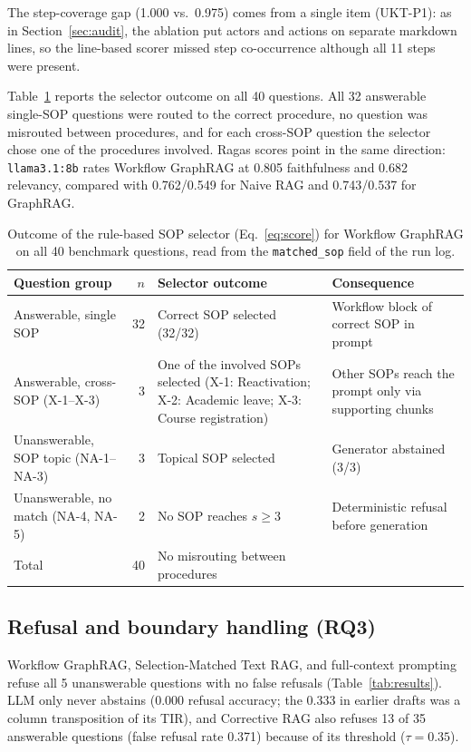 \documentclass[preprint,10pt]{elsarticle}
\begin{document}
The step-coverage gap (1.000 vs.\ 0.975) comes from a single item (UKT-P1): as in Section~\ref{sec:audit}, the ablation put actors and actions on separate markdown lines, so the line-based scorer missed step co-occurrence although all 11 steps were present.

Table~\ref{tab:selection} reports the selector outcome on all 40 questions. All 32 answerable single-SOP questions were routed to the correct procedure, no question was misrouted between procedures, and for each cross-SOP question the selector chose one of the procedures involved. Ragas scores point in the same direction: \texttt{llama3.1:8b} rates Workflow GraphRAG at 0.805 faithfulness and 0.682 relevancy, compared with 0.762/0.549 for Naive RAG and 0.743/0.537 for GraphRAG.

\begin{table}[!htbp]
\centering
\caption{Outcome of the rule-based SOP selector (Eq.~\eqref{eq:score}) for Workflow GraphRAG on all 40 benchmark questions, read from the \texttt{matched\_sop} field of the run log.}
\label{tab:selection}
\small
\setlength{\tabcolsep}{4pt}
\begin{tabularx}{\textwidth}{>{\raggedright\arraybackslash}p{2.7cm} r >{\raggedright\arraybackslash}X >{\raggedright\arraybackslash}p{3.0cm}}
\toprule
Question group & $n$ & Selector outcome & Consequence \\
\midrule
Answerable, single SOP & 32 & Correct SOP selected (32/32) & Workflow block of correct SOP in prompt \\
Answerable, cross-SOP (X-1--X-3) & 3 & One of the involved SOPs selected (X-1: Reactivation; X-2: Academic leave; X-3: Course registration) & Other SOPs reach the prompt only via supporting chunks \\
Unanswerable, SOP topic (NA-1--NA-3) & 3 & Topical SOP selected & Generator abstained (3/3) \\
Unanswerable, no match (NA-4, NA-5) & 2 & No SOP reaches $s \geq 3$ & Deterministic refusal before generation \\
\midrule
Total & 40 & No misrouting between procedures & \\
\bottomrule
\end{tabularx}
\end{table}

\subsection{Refusal and boundary handling (RQ3)}
Workflow GraphRAG, Selection-Matched Text RAG, and full-context prompting refuse all 5 unanswerable questions with no false refusals (Table~\ref{tab:results}). LLM only never abstains (0.000 refusal accuracy; the 0.333 in earlier drafts was a column transposition of its TIR), and Corrective RAG also refuses 13 of 35 answerable questions (false refusal rate 0.371) because of its threshold ($\tau=0.35$).
\end{document}
